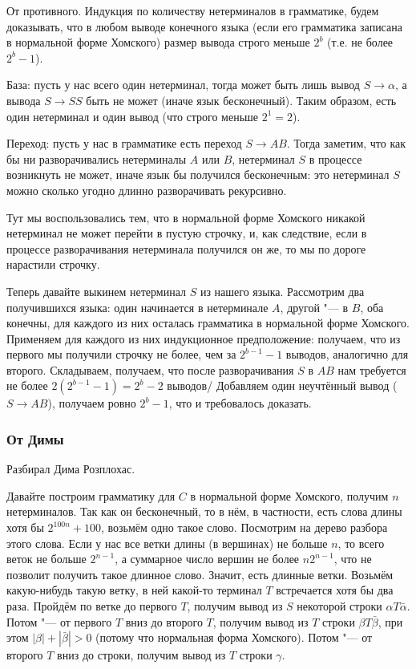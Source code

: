 		От противного.
		Индукция по количеству нетерминалов в грамматике, будем доказывать, что в любом выводе конечного языка
		(если его грамматика записана в нормальной форме Хомского) размер вывода строго меньше $2^b$ (т.е. не более $2^b-1$).

		База: пусть у нас всего один нетерминал, тогда может быть лишь вывод $S\to \alpha$,
		а вывода $S \to SS$ быть не может (иначе язык бесконечный).
		Таким образом, есть один нетерминал и один вывод (что строго меньше $2^1=2$).

		Переход: пусть у нас в грамматике есть переход $S \to AB$.
		Тогда заметим, что как бы ни разворачивались нетерминалы $A$ или $B$, нетерминал $S$ в процессе возникнуть не может,
		иначе язык бы получился бесконечным: это нетерминал $S$ можно сколько угодно длинно разворачивать рекурсивно.
		\begin{Rem}
			Тут мы воспользовались тем, что в нормальной форме Хомского никакой нетерминал не может перейти в пустую строчку,
			и, как следствие, если в процессе разворачивания нетерминала получился он же, то мы по дороге нарастили строчку.
		\end{Rem}
		Теперь давайте выкинем нетерминал $S$ из нашего языка.
		Рассмотрим два получившихся языка: один начинается в нетерминале $A$, другой "--- в $B$, оба конечны,
		для каждого из них осталась грамматика в нормальной форме Хомского.
		Применяем для каждого из них индукционное предположение: получаем, что из первого мы получили строчку не более, чем за $2^{b-1}-1$ выводов, аналогично для второго.
		Складываем, получаем, что после разворачивания $S$ в $AB$ нам требуется не более $2(2^{b-1}-1)=2^b-2$ выводов/
		Добавляем один неучтённый вывод ($S \to AB$), получаем ровно $2^b-1$, что и требовалось доказать.

	\subsubsection{От Димы}
		Разбирал Дима Розплохас.

		Давайте построим грамматику для $C$ в нормальной форме Хомского, получим $n$ нетерминалов.
		Так как он бесконечный, то в нём, в частности, есть слова длины хотя бы $2^{100n}+100$, возьмём одно такое слово.
		Посмотрим на дерево разбора этого слова.
		Если у нас все ветки длины (в вершинах) не больше $n$, то всего веток не больше $2^{n-1}$, а
		суммарное число вершин не более $n2^{n-1}$, что не позволит получить такое длинное слово.
		Значит, есть длинные ветки.
		Возьмём какую-нибудь такую ветку, в ней какой-то терминал $T$ встречается хотя бы два раза.
		Пройдём по ветке до первого $T$, получим вывод из $S$ некоторой строки $\alpha T \bar\alpha$.
		Потом "--- от первого $T$ вниз до второго $T$, получим вывод из $T$ строки $\beta T \bar\beta$,
		при этом $|\beta| + |\bar\beta| > 0$ (потому что нормальная форма Хомского).
		Потом "--- от второго $T$ вниз до строки, получим вывод из $T$ строки $\gamma$.

